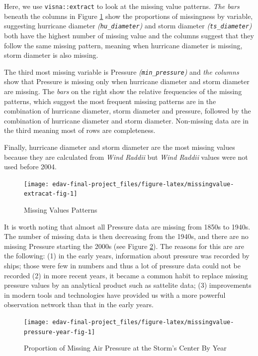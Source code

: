 \documentclass[]{book}
\begin{document}
Here, we use \texttt{visna::extract} to look at the missing value patterns. \emph{The bars} beneath the columns in Figure \ref{fig:missingvalue-extracat-fig} show the proportions of missingness by variable, suggesting hurricane diameter \emph{(\texttt{hu\_diameter})} and storm diameter \emph{(\texttt{ts\_diameter})} both have the highest number of missing value and the columns suggest that they follow the same missing pattern, meaning when hurricane diameter is missing, storm diameter is also missing.

The third most missing variable is Pressure \emph{(\texttt{min\_pressure})} and \emph{the columns} show that Pressure is missing only when hurricane diameter and storm diameter are missing. The \emph{bars} on the right show the relative frequencies of the missing patterns, which suggest the most frequent missing patterns are in the combination of hurricane diameter, storm diameter and pressure, followed by the combination of hurricane diameter and storm diameter. Non-missing data are in the third meaning most of rows are completeness.

Finally, hurricane diameter and storm diameter are the most missing values because they are calculated from \emph{Wind Raddii} but \emph{Wind Raddii} values were not used before 2004.

\begin{figure}

{\centering \texttt{[image: edav-final-project\_files/figure-latex/missingvalue-extracat-fig-1]} 

}

\caption{Missing Values Patterns}\label{fig:missingvalue-extracat-fig}
\end{figure}

It is worth noting that almost all Pressure data are missing from 1850s to 1940s. The number of missing data is then decreasing from the 1940s, and there are no missing Pressure starting the 2000s (see Figure \ref{fig:missingvalue-pressure-year-fig}). The reasons for this are are the following: (1) in the early years, information about pressure was recorded by ships; those were few in numbers and thus a lot of pressure data could not be recorded (2) in more recent years, it became a common habit to replace missing pressure values by an analytical product such as sattelite data; (3) improvements in modern tools and technologies have provided us with a more powerful observation network than that in the early years.

\begin{figure}

{\centering \texttt{[image: edav-final-project\_files/figure-latex/missingvalue-pressure-year-fig-1]} 

}

\caption{Proportion of Missing Air Pressure at the Storm's Center By Year}\label{fig:missingvalue-pressure-year-fig}
\end{figure}
\end{document}
